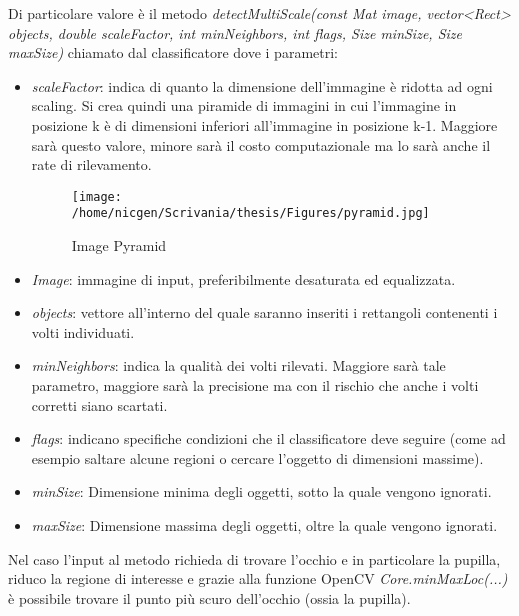 Di particolare valore è il metodo \textit{detectMultiScale(const Mat image, vector<Rect> objects, double scaleFactor, int minNeighbors, int flags, Size minSize, Size maxSize)} chiamato dal classificatore dove i parametri:
 \begin{itemize}
 \item \textit{scaleFactor}: indica di quanto la dimensione dell'immagine è ridotta ad ogni scaling. Si crea quindi una piramide di immagini in cui l'immagine in posizione k è di dimensioni inferiori all'immagine in posizione k-1. Maggiore sarà questo valore, minore sarà il costo computazionale ma lo sarà anche il rate di rilevamento.

\begin{figure}[h]\centering  
\texttt{[image: /home/nicgen/Scrivania/thesis/Figures/pyramid.jpg]}
\caption[Image Pyramid]{Image Pyramid}
\label{pic-a}
\end{figure} 

\item \textit{Image}: immagine di input, preferibilmente desaturata ed equalizzata.

\item \textit{objects}: vettore all'interno del quale saranno inseriti i rettangoli contenenti i volti individuati.

\item \textit{minNeighbors}: indica la qualità dei volti rilevati. Maggiore sarà tale parametro, maggiore sarà la precisione ma con il rischio che anche i volti corretti siano scartati.

\item \textit{flags}: indicano specifiche condizioni che il classificatore deve seguire (come ad esempio saltare alcune regioni o cercare l'oggetto di dimensioni massime).

\item \textit{minSize}: Dimensione minima degli oggetti, sotto la quale vengono ignorati.

\item \textit{maxSize}: Dimensione massima degli oggetti, oltre la quale vengono ignorati.
 
\end{itemize}
 
Nel caso l'input al metodo richieda di trovare l'occhio e in particolare la pupilla, riduco la regione di interesse e grazie alla funzione OpenCV \textit{Core.minMaxLoc(...)} è possibile trovare il punto più scuro dell'occhio (ossia la pupilla). 

